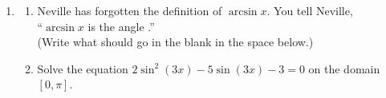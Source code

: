 \documentclass{article}
\begin{document}
\begin{enumerate}
\begin{enumerate}
{\begin{center}
\begin{itemize}
\end{itemize}
\end{center}
    }
\end{enumerate}

\item \label{spring2014-mb-midterm1-3-modified} 

  \begin{enumerate}
  \item \label{spring2012-mb-midterm1-5a}
    \begin{problem}[0.5in]
      Neville has forgotten the definition of $\arcsin x$.  You tell
      Neville, \\
      ``$\arcsin x$ is the angle .'' \\(Write what should go in the blank in the space below.)
    \end{problem}

  \item
    \begin{problem}[\stretch{3}]
      Solve the equation $2\sin^2(3x) -5 \sin (3x) - 3=0$ on the domain
      $[0, \pi]$.
    \end{problem}


\end{enumerate}
\end{enumerate}
\end{document}
